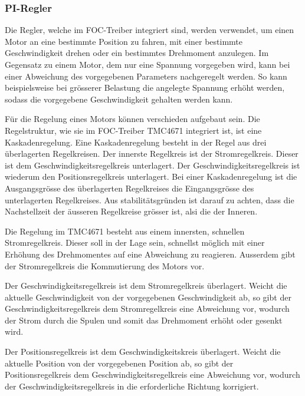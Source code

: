 \subsubsection{PI-Regler}
\label{subsubsec:PI_Regler}


Die Regler, welche im FOC-Treiber integriert sind, werden verwendet, um einen Motor an eine bestimmte Position zu fahren, mit einer bestimmte Geschwindigkeit drehen oder ein bestimmtes Drehmoment anzulegen. Im Gegensatz zu einem Motor, dem nur eine Spannung vorgegeben wird, kann bei einer Abweichung des vorgegebenen Parameters nachgeregelt werden. So kann beispielsweise bei grösserer Belastung die angelegte Spannung erhöht werden, sodass die vorgegebene Geschwindigkeit gehalten werden kann.

Für die Regelung eines Motors können verschieden aufgebaut sein. Die Regelstruktur, wie sie im FOC-Treiber TMC4671 integriert ist, ist eine Kaskadenregelung. Eine Kaskadenregelung besteht in der Regel aus drei überlagerten Regelkreisen. Der innerste Regelkreis ist der Stromregelkreis. Dieser ist dem Geschwindigkeitsregelkreis unterlagert. Der Geschwindigkeitsregelkreis ist wiederum den Positionsregelkreis unterlagert. Bei einer Kaskadenregelung ist die Ausgangsgrösse des überlagerten Regelkreises die Eingangsgrösse des unterlagerten Regelkreises. Aus stabilitätsgründen ist darauf zu achten, dass die Nachstellzeit der äusseren Regelkreise grösser ist, alsi die der Inneren.

Die Regelung im TMC4671 besteht aus einem innersten, schnellen Stromregelkreis. Dieser soll in der Lage sein, schnellst möglich mit einer Erhöhung des Drehmomentes auf eine Abweichung zu reagieren. Ausserdem gibt der Stromregelkreis die Kommutierung des Motors vor.

Der Geschwindigkeitsregelkreis ist dem Stromregelkreis überlagert. Weicht die aktuelle Geschwindigkeit von der vorgegebenen Geschwindigkeit ab, so gibt der Geschwindigkeitsregelkreis dem Stromregelkreis eine Abweichung vor, wodurch der Strom durch die Spulen und somit das Drehmoment erhöht oder gesenkt wird.

Der Positionsregelkreis ist dem Geschwindigkeitskreis überlagert. Weicht die aktuelle Position von der vorgegebenen Position ab, so gibt der Positionsregelkreis dem Geschwindigkeitsregelkreis eine Abweichung vor, wodurch der Geschwindigkeitsregelkreis in die erforderliche Richtung korrigiert.


